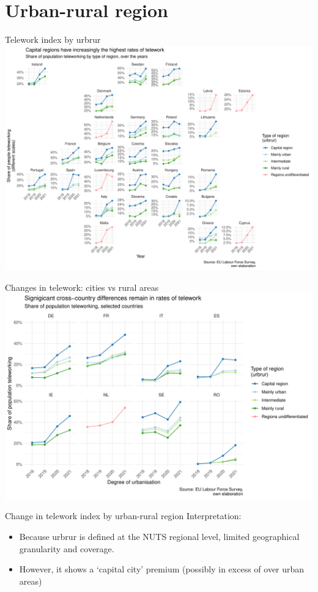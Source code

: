 \documentclass[10pt]{beamer}
\begin{document}
\section{Urban-rural region}
\begin{frame}{Telework index by urbrur}
\centering
\includegraphics[width=\textwidth,height=0.9\textheight,keepaspectratio]{Telework_urbrur_eu.pdf}
\end{frame}

\begin{frame}{Changes in telework: cities vs rural areas}
\centering
\includegraphics[width=\textwidth,height=0.9\textheight,keepaspectratio]{Telework_urbrur_selected.pdf}
\end{frame}


\begin{frame}{Change in telework index by urban-rural region}
Interpretation:
\begin{itemize}
\item Because urbrur is defined at the NUTS regional level, limited geographical granularity and coverage.
\item However, it shows a `capital city' premium (possibly in excess of over urban areas)
\end{itemize}
\end{frame}
\end{document}
